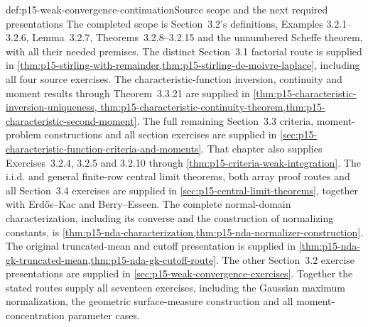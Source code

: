 \begin{proofboundary}{def:p15-weak-convergence-continuation}{Source scope and the next required presentations}
The completed scope is Section~3.2's definitions, Examples
3.2.1--3.2.6, Lemma~3.2.7, Theorems~3.2.8--3.2.15 and the
unnumbered Scheffe theorem, with all their needed premises.
The distinct Section~3.1 factorial route is supplied in
\cref{thm:p15-stirling-with-remainder,thm:p15-stirling-de-moivre-laplace},
including all four source exercises. The characteristic-function
inversion, continuity and moment results through Theorem~3.3.21 are
supplied in \cref{thm:p15-characteristic-inversion-uniqueness,
thm:p15-characteristic-continuity-theorem,thm:p15-characteristic-second-moment}.
The full remaining Section~3.3 criteria, moment-problem constructions
and all section exercises are supplied in
\cref{sec:p15-characteristic-function-criteria-and-moments}.
That chapter also supplies Exercises~3.2.4, 3.2.5 and 3.2.10 through
\cref{thm:p15-criteria-weak-integration}.
The i.i.d. and general finite-row central limit theorems,
both array proof routes and all Section~3.4 exercises are supplied in
\cref{sec:p15-central-limit-theorems}, together with Erd\H{o}s--Kac
and Berry--Esseen. The complete normal-domain characterization,
including its converse and the construction of normalizing constants,
is \cref{thm:p15-nda-characterization,thm:p15-nda-normalizer-construction}.
The original truncated-mean and cutoff presentation is supplied in
\cref{thm:p15-nda-gk-truncated-mean,thm:p15-nda-gk-cutoff-route}.
The other Section~3.2 exercise presentations are supplied in
\cref{sec:p15-weak-convergence-exercises}. Together the stated
routes supply all seventeen exercises, including the Gaussian
maximum normalization, the geometric surface-measure construction
and all moment-concentration parameter cases.
\end{proofboundary}
